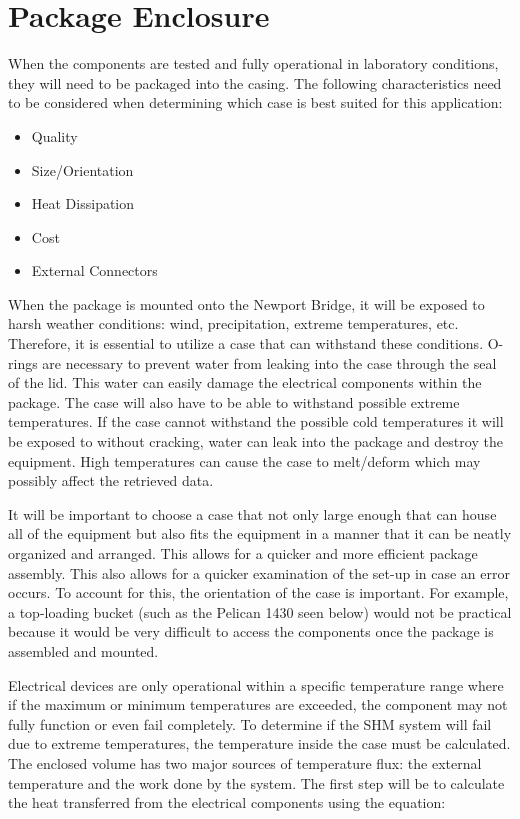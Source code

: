 \section{Package Enclosure}

When the components are tested and fully operational in laboratory conditions, they will need to be packaged into the casing. The following
characteristics need to be considered when determining which case is best suited for this application:

\begin{itemize}
\item {Quality} 
\item {Size/Orientation}
\item {Heat Dissipation} 
\item {Cost} 
\item {External Connectors}
\end{itemize}


When the package is mounted onto the Newport Bridge, it will be exposed to harsh weather conditions: wind, precipitation, extreme temperatures,
etc. Therefore, it is essential to utilize a case that can withstand these conditions. O-rings are necessary to prevent water from leaking into
the case through the seal of the lid. This water can easily damage the electrical components within the package. The case will also have to be able to
withstand possible extreme temperatures. If the case cannot withstand the possible cold temperatures it will be exposed to without cracking, water can
leak into the package and destroy the equipment. High temperatures can cause the case to melt/deform which may possibly affect the retrieved data. 

It will be important to choose a case that not only large enough that can house all of the equipment but also fits the equipment in a manner that it can
be neatly organized and arranged. This allows for a quicker and more efficient package assembly. This also allows for a quicker examination of the
set-up in case an error occurs. To account for this, the orientation of the case is important. For example, a top-loading bucket (such as the Pelican
1430 seen below) would not be practical because it would be very difficult to access the components once the package is assembled and mounted.  



Electrical devices are only operational within a specific temperature range where if the maximum or minimum temperatures are exceeded, the component may
not fully function or even fail completely. To determine if the SHM system will fail due to extreme temperatures, the temperature inside the case must
be calculated. The enclosed volume has two major sources of temperature flux: the external temperature and the work done by the system. The first step
will be to calculate the heat transferred from the electrical components using the equation:

